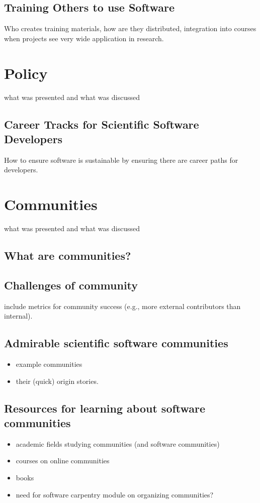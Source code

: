 \documentclass[11pt, oneside]{amsart}
\begin{document}
\subsection{Training Others to use Software}

Who creates training materials, how are they distributed, integration into courses when projects see very wide application in research.

\section{Policy}

what was presented and what was discussed

\subsection{Career Tracks for Scientific Software Developers}

How to ensure software is sustainable by ensuring there are career paths for developers.

\section{Communities}

what was presented and what was discussed

\subsection{What are communities?}
\subsection{Challenges of community}
include metrics for community success (e.g., more external contributors than internal).
\subsection{Admirable scientific software communities}
\begin{itemize}
\item example communities
\item their (quick) origin stories.
\end{itemize}
\subsection{Resources for learning about software communities}
\begin{itemize}
\item academic fields studying communities (and software communities)
\item courses on online communities
\item books
\item need for software carpentry module on organizing communities?
\end{itemize}
\end{document}
